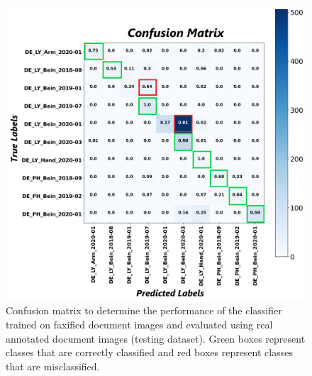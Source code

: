 







\begin{figure}[H]
    \begin{center}
	\includegraphics[scale=0.20]{images/Evaluation/Confusion_Matrix_Faxified_Data_Classifier_2021-05-31_19-31-35.png}
	\caption[Confusion matrix to determine the performance of the classifier trained on faxified document images and evaluated using real annotated document images (test dataset).]{Confusion matrix to determine the performance of the classifier trained on faxified document images and evaluated using real annotated document images (testing dataset). Green boxes represent classes that are correctly classified and red boxes represent classes that are misclassified.}
	\label{fig:CMFaxifiedDocumentImagesClassifier}
	\end{center}
\end{figure}

